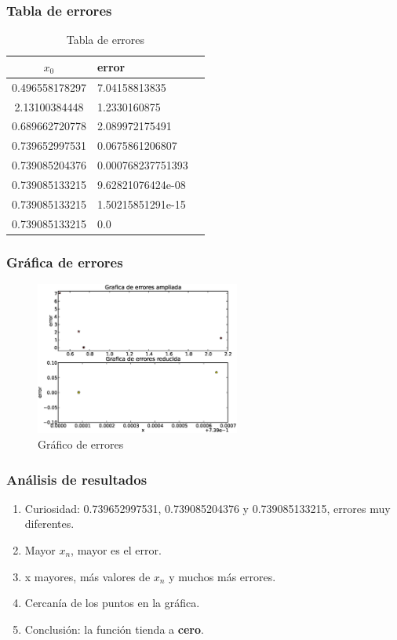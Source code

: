 \documentclass{beamer}
\begin{document}
\begin{frame}
\frametitle{Tabla de errores}
\begin{table}[!ht]
\begin{center}
\begin{tabular}{|c|l|l|}
\hline
     $x_0$     &      error        \\ \hline
0.496558178297 & 7.04158813835     \\ \hline
2.13100384448  & 1.2330160875      \\ \hline
0.689662720778 & 2.089972175491    \\ \hline
0.739652997531 & 0.0675861206807   \\ \hline
0.739085204376 & 0.000768237751393 \\ \hline
0.739085133215 & 9.62821076424e-08 \\ \hline
0.739085133215 & 1.50215851291e-15 \\ \hline
0.739085133215 & 0.0               \\ \hline

\end{tabular}
\end{center}
\caption{Tabla de errores}
\end{table}
\end{frame}

\begin{frame}
\frametitle{Gráfica de errores}
\begin{figure}[!th]
\begin{center}
\includegraphics[width=0.6\textwidth]{images/Grafica_de_errores.eps}
\caption{Gráfico de errores}
\end{center}
\end{figure}
\end{frame}

\begin{frame}
\frametitle{Análisis de resultados}
\begin{enumerate}
\item Curiosidad: 0.739652997531, 0.739085204376 y 0.739085133215, errores muy diferentes. \pause
\item Mayor $x_n$, mayor es el error. \pause
\item x mayores, más valores de $x_n$ y muchos más errores. \pause 
\item Cercanía de los puntos en la gráfica. \pause
\item Conclusión: la función tienda a {\bf cero}. 
\end{enumerate}
\end{frame}
\end{document}
